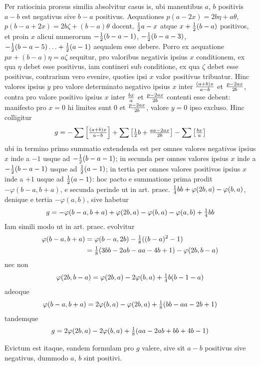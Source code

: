 \documentclass[twoside,12pt, showframe]{memoir}
\let\oldfrac\frac
\def\frac#1#2{\mathchoice{\tfrac{#1}{#2}}{\oldfrac{#1}{#2}}{\genfrac{}{}{}{2}{#1}{#2\mathstrut}}{\genfrac{}{}{}{3}{#1}{#2\mathstrut}}}
\begin{document}
Per ratiocinia prorsus similia absolvitur casus is, ubi manentibus \(a\), \( b\) positivis \(a-b\) est negativus sive \(b-a\) positivus. Aequationes \(p(a-2 x)=2 b \eta+a \theta\), \(p(b-a+2 x)=2 b \zeta+(b-a) \theta\) docent, \(\frac{1}{2} a-x\) atque \(x+\frac{1}{2}(b-a)\) positivos, et proin \(x\) alicui numerorum \(-\frac{1}{2}(b-a-1)\), \(-\frac{1}{2}(b-a-3)\), \(-\frac{1}{2}(b-a-5) \ldots+\frac{1}{2}(a-1)\) aequalem esse debere. Porro ex aequatione \(p x+(b-a) \eta=a \zeta\) sequitur, pro valoribus negativis ipsius \(x\) conditionem, ex qua \(\eta\) debet esse positivus, iam contineri sub conditione, ex qua \(\zeta\) debet esse positivus, contrarium vero evenire, quoties ipsi \(x\) valor positivus tribuatur. Hinc valores ipsius \(y\) pro valore determinato negativo ipsius \(x\) inter \(\frac{(a+b) x}{a-b}\) et \(\frac{p-2 a x}{2 b}\), contra pro valore positivo ipsius \(x\) inter \(\frac{b x}{a}\) et \(\frac{p-2 a x}{2 b}\) contenti esse debent: manifesto pro \(x=0\) hi limites sunt \(0\) et \(\frac{p-2 a x}{2 b}\), valore \(y=0\) ipso excluso. Hinc colligitur
\[g=-\sum\left[\frac{(a+b) x}{a-b}\right]+\sum\left[\frac{1}{2} b+\frac{a a-2 a x}{2 b}\right]-\sum\left[\frac{b x}{a}\right]\]
ubi in termino primo summatio extendenda est per omnes valores negativos ipsius \(x\) inde a \(-1\) usque ad \(-\frac{1}{2}(b-a-1)\); in secunda per omnes valores ipsius \(x\) inde a \(-\frac{1}{2}(b-a-1)\) usque ad \(\frac{1}{2}(a-1)\); in tertia per omnes valores positivos ipsius \(x\) inde a \(+1\) usque ad \(\frac{1}{2}(a-1)\): hoc pacto e summatione prima prodit \(-\varphi(b-a, b+a)\), e secunda perinde ut in art. praec. \(\frac{1}{4} b b+\varphi(2 b, a)-\varphi(b, a)\), denique e tertia \(-\varphi(a, b)\), sive habetur
\[g=-\varphi(b-a, b+a)+\varphi(2 b, a)-\varphi(b, a)-\varphi(a, b)+\frac{1}{4} b b\]
Iam simili modo ut in art. praec. evolvitur\clearpage\noindent%
\[\begin{aligned}
\varphi(b-a, b+a) & =\varphi(b-a, 2 b)-\frac{1}{8}((b-a)^{2}-1) \\
& =\frac{1}{8}(3 b b-2 a b-a a-4 b+1)-\varphi(2 b, b-a)
\end{aligned}\]
nec non
\[\varphi(2 b, b-a)=\varphi(2 b, a)-2 \varphi(b, a)+\frac{1}{4} b(b-1-a)\]
adeoque
\[\varphi(b-a, b+a)=2 \varphi(b, a)-\varphi(2 b, a)+\frac{1}{8}(b b-a a-2 b+1)\]
tandemque
\[g=2 \varphi(2 b, a)-2 \varphi(b, a)+\frac{1}{8}(a a-2 a b+b b+4 b-1)\]
 
Evictum est itaque, eandem formulam pro \(g\) valere, sive sit \(a-b\) positivus sive negativus, dummodo \(a\), \(b\) sint positivi.
\end{document}
